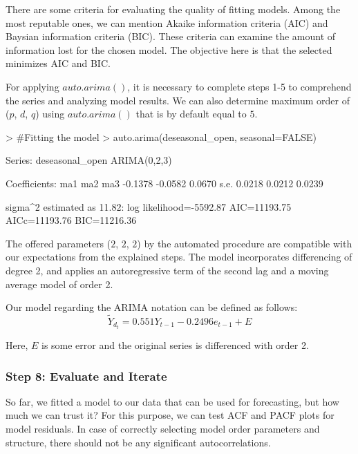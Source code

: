 \documentclass{article}
\begin{document}
There are some criteria for evaluating the quality of fitting models. Among the most reputable ones, we can mention Akaike information criteria (AIC) and Baysian information criteria (BIC). These criteria can examine the amount of information lost for the chosen model. The objective here is that the selected minimizes AIC and BIC.

For applying $auto.arima()$, it is necessary to complete steps 1-5 to comprehend the series and analyzing model results. We can also determine maximum order of ($p$, $d$, $q$) using $auto.arima()$ that  is by default equal to $5$.
\begin{Schunk}
\begin{Sinput}
> #Fitting the model
> auto.arima(deseasonal_open, seasonal=FALSE)
\end{Sinput}
\begin{Soutput}
Series: deseasonal_open 
ARIMA(0,2,3) 

Coefficients:
          ma1      ma2     ma3
      -0.1378  -0.0582  0.0670
s.e.   0.0218   0.0212  0.0239

sigma^2 estimated as 11.82:  log likelihood=-5592.87
AIC=11193.75   AICc=11193.76   BIC=11216.36
\end{Soutput}
\end{Schunk}

The offered parameters ($2$, $2$, $2$) by the automated procedure are compatible with our expectations from the explained steps. The model incorporates differencing of degree 2, and applies an autoregressive term of the second lag and a moving average model of order 2.

Our model regarding the ARIMA notation can be defined as follows:
\begin{equation}
\tilde{Y}_{d_t}=0.551Y_{t-1}-0.2496e_{t-1}+E
\end{equation}

Here, $E$ is some error and the original series is differenced with order 2.

\subsubsection*{Step 8: Evaluate and Iterate}

So far, we fitted a model to our data that can be used for forecasting, but how much we can trust it? For this purpose, we can test ACF and PACF plots for model residuals.  In case of correctly selecting model order parameters and structure, there should not be any significant autocorrelations.
\end{document}
